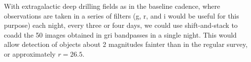With extragalactic deep drilling fields as in the baseline cadence,
where observations are taken in a series of filters (g, r, and i
would be useful for this purpose) each night, every three or four
days, we could use shift-and-stack to coadd the 50 images obtained in
gri bandpasses in a single night. This would allow detection of
objects about 2 magnitudes fainter than in the regular survey, or
approximately $r=26.5$.
%
%


\navigationbar
